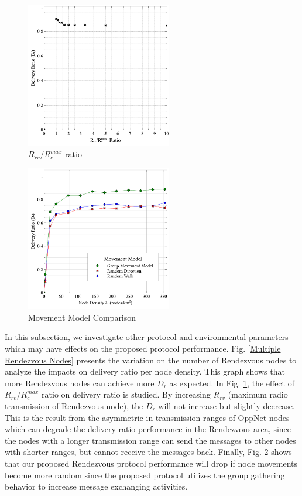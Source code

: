 \documentclass[conference]{IEEEtran}
\begin{document}
\begin{figure}[!t]
\centering
\includegraphics[width=2.5in]{Graphs/RcmaxRrv.pdf}
\caption{$R_{rv}$/$R_c^{max}$ ratio}
\label{RrvRcmaxRatio}
\end{figure}

\begin{figure}[!t]
\centering
\includegraphics[width=2.5in]{Graphs/movement.pdf}
\caption{Movement Model Comparison}
\label{Movement Model Comparison}
\end{figure}

In this subsection, we investigate other protocol and environmental parameters which may have effects on the proposed protocol performance.
%
Fig. \ref{Multiple Rendezvous Nodes} presents the variation on the number of Rendezvous nodes to analyze the impacts on delivery ratio per node density.
%
This graph shows that more Rendezvous nodes can achieve more $D_r$ as expected.
%
In Fig. \ref{RrvRcmaxRatio}, the effect of $R_{rv}/R_c^{max}$ ratio on delivery ratio is studied.
% 
By increasing $R_{rv}$ (maximum radio transmission of Rendezvous node), the $D_r$ will not increase but slightly decrease.
%
This is the result from the asymmetric in transmission ranges of OppNet nodes which can degrade the delivery ratio performance in the Rendezvous area, since the nodes with a longer transmission range can send the messages to other nodes with shorter ranges, but cannot receive the messages back.
Finally, Fig. \ref{Movement Model Comparison} shows that our proposed Rendezvous protocol performance will drop if node movements become more random since the proposed protocol utilizes the group gathering behavior to increase message exchanging activities.
\end{document}
